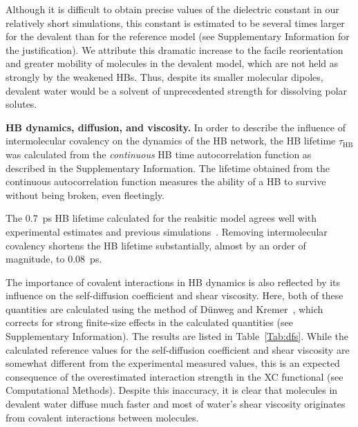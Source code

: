 \documentclass[journal=jacsat,manuscript=article]{achemso}
\newcommand{\old}{\color{black}}
\begin{document}
Although it is difficult to obtain precise values of the dielectric constant in our relatively short simulations, this constant is estimated to be several times larger for the devalent than for the reference model (see Supplementary Information for the justification). 
We attribute this dramatic increase to the facile reorientation and greater mobility of molecules in the devalent model, which are not held as strongly by the weakened HBs. 
Thus, despite its smaller molecular dipoles, devalent water would be a solvent of unprecedented strength for dissolving polar solutes.

\textbf{HB dynamics, diffusion, and viscosity.} In order to describe the influence of intermolecular covalency on the dynamics of the HB network, the HB lifetime $\tau_{\text{HB}}$ was calculated from the \emph{continuous} HB time autocorrelation function as described in the Supplementary Information. The lifetime obtained from the continuous autocorrelation function measures the ability of a HB to survive without being broken, even fleetingly.

The 0.7~ps HB lifetime calculated for the realsitic model agrees well with experimental estimates \cite{lawrence2003ultrafast} and previous simulations~\cite{marti1996molecular,starr1999fast}. Removing intermolecular covalency shortens the HB lifetime substantially, almost by an order of magnitude, to 0.08~ps. 


The importance of covalent interactions in HB dynamics is also reflected by its influence on the self-diffusion coefficient and shear viscosity. 
Here, both of these quantities are calculated using the method of D\"unweg and Kremer~\cite{dunweg1993molecular}, which corrects for strong finite-size effects in the calculated quantities (see Supplementary Information). The results are listed in Table~\ref{Tab:dfs}. 
While the calculated reference values for the self-diffusion coefficient and shear viscosity are somewhat different from the experimental measured values, this is an expected consequence of the overestimated interaction strength in the XC functional (see Computational Methods). 
Despite this inaccuracy, it is clear that molecules in devalent water diffuse much faster and most of water's shear viscosity originates from covalent interactions between molecules.
\end{document}
